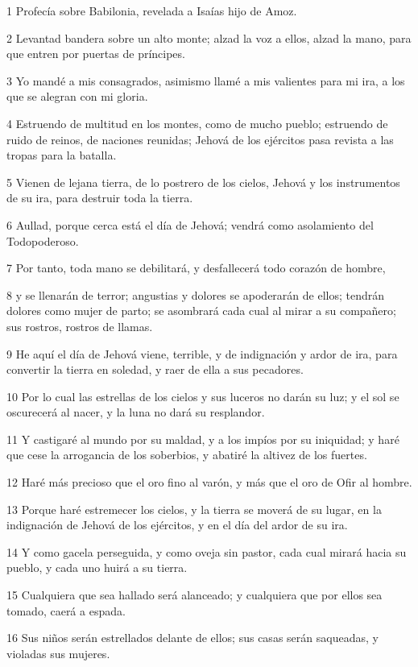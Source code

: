 \par 1 Profecía sobre Babilonia, revelada a Isaías hijo de Amoz.
\par 2 Levantad bandera sobre un alto monte; alzad la voz a ellos, alzad la mano, para que entren por puertas de príncipes.
\par 3 Yo mandé a mis consagrados, asimismo llamé a mis valientes para mi ira, a los que se alegran con mi gloria.
\par 4 Estruendo de multitud en los montes, como de mucho pueblo; estruendo de ruido de reinos, de naciones reunidas; Jehová de los ejércitos pasa revista a las tropas para la batalla.
\par 5 Vienen de lejana tierra, de lo postrero de los cielos, Jehová y los instrumentos de su ira, para destruir toda la tierra.
\par 6 Aullad, porque cerca está el día de Jehová; vendrá como asolamiento del Todopoderoso. 
\par 7 Por tanto, toda mano se debilitará, y desfallecerá todo corazón de hombre,
\par 8 y se llenarán de terror; angustias y dolores se apoderarán de ellos; tendrán dolores como mujer de parto; se asombrará cada cual al mirar a su compañero; sus rostros, rostros de llamas.
\par 9 He aquí el día de Jehová viene, terrible, y de indignación y ardor de ira, para convertir la tierra en soledad, y raer de ella a sus pecadores.
\par 10 Por lo cual las estrellas de los cielos y sus luceros no darán su luz; y el sol se oscurecerá al nacer, y la luna no dará su resplandor. 
\par 11 Y castigaré al mundo por su maldad, y a los impíos por su iniquidad; y haré que cese la arrogancia de los soberbios, y abatiré la altivez de los fuertes.
\par 12 Haré más precioso que el oro fino al varón, y más que el oro de Ofir al hombre.
\par 13 Porque haré estremecer los cielos, y la tierra se moverá de su lugar, en la indignación de Jehová de los ejércitos, y en el día del ardor de su ira.
\par 14 Y como gacela perseguida, y como oveja sin pastor, cada cual mirará hacia su pueblo, y cada uno huirá a su tierra.
\par 15 Cualquiera que sea hallado será alanceado; y cualquiera que por ellos sea tomado, caerá a espada.
\par 16 Sus niños serán estrellados delante de ellos; sus casas serán saqueadas, y violadas sus mujeres.
